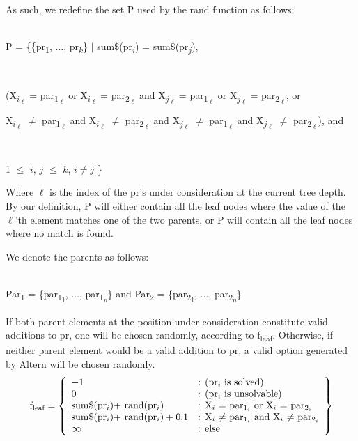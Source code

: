\documentclass[11pt, oneside]{article}   	%
\begin{document}
\noindent As such, we redefine the set P used by the rand function as follows:\\\\
\centerline{P =  \{\{pr\textsubscript{1}, $\dots$, pr\textsubscript{$k$}\} $\vert$ sum$\$$(pr\textsubscript{$i$}) = sum$\$$(pr\textsubscript{$j$}),}\\
\centerline{(X\textsubscript{$i$\textsubscript{$\ell$}} = par\textsubscript{1\textsubscript{$\ell$}} or X\textsubscript{$i$\textsubscript{$\ell$}} = par\textsubscript{2\textsubscript{$\ell$}} and X\textsubscript{$j$\textsubscript{$\ell$}} = par\textsubscript{1\textsubscript{$\ell$}} or X\textsubscript{$j$\textsubscript{$\ell$}} = par\textsubscript{2\textsubscript{$\ell$}}, or }
\centerline{X\textsubscript{$i$\textsubscript{$\ell$}} $\neq$ par\textsubscript{1\textsubscript{$\ell$}} and X\textsubscript{$i$\textsubscript{$\ell$}} $\neq$ par\textsubscript{2\textsubscript{$\ell$}} and X\textsubscript{$j$\textsubscript{$\ell$}} $\neq$ par\textsubscript{1\textsubscript{$\ell$}} and X\textsubscript{$j$\textsubscript{$\ell$}} $\neq$ par\textsubscript{2\textsubscript{$\ell$}}), and}\\
\centerline{1 $\leq$ $i$, $j$ $\leq$ $k$, $i \neq j$ \}}

\noindent Where $\ell$ is the index of the pr's under consideration at the current tree depth. By our definition, P will either contain all the leaf nodes where the value of the $\ell$'th element matches one of the two parents, or P will contain all the leaf nodes where no match is found.

\noindent We denote the parents as follows:\\\\
\centerline{Par\textsubscript{1} = \{par\textsubscript{1\textsubscript{1}}, $\dots$, par\textsubscript{1\textsubscript{$n$}}\} and Par\textsubscript{2} = \{par\textsubscript{2\textsubscript{1}}, $\dots$, par\textsubscript{2\textsubscript{$n$}}\}}

\noindent If both parent elements at the position under consideration constitute valid additions to pr, one will be chosen randomly, according to f\textsubscript{leaf}. Otherwise, if neither parent element would be a valid addition to pr, a valid option generated by Altern will be chosen randomly.
     \[
         \text{f\textsubscript{leaf}} = \left\{\begin{array}{ll}
             -1 & \text{: (pr\textsubscript{$i$} is solved)}\\
             0 & \text{: (pr\textsubscript{$i$} is unsolvable)}\\
             \text{sum$\$$(pr\textsubscript{$i$})+ rand(pr\textsubscript{$i$})} & \text{: X\textsubscript{$i$} = par\textsubscript{1\textsubscript{$i$}} or X\textsubscript{$i$} = par\textsubscript{2\textsubscript{$i$}}}\\
             \text{sum$\$$(pr\textsubscript{$i$})+ rand(pr\textsubscript{$i$})} + 0.1 & \text{: X\textsubscript{$i$} $\neq$ par\textsubscript{1\textsubscript{$i$}} and X\textsubscript{$i$} $\neq$ par\textsubscript{2\textsubscript{$i$}}}\\
 	\infty & \text{: else}
             \end{array}\right\}
       \]
\end{document}
